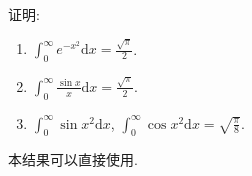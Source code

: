 \documentclass[../../main.tex]{subfiles}
\begin{document}
\begin{proposition}\label{proposition:重要定积分结果(必记)}
证明:
\begin{enumerate}[(1)]
\item \(\int_{0}^{\infty} e^{-x^{2}}\mathrm{d}x=\frac{\sqrt{\pi}}{2}\).

\item \(\int_{0}^{\infty} \frac{\sin x}{x}\mathrm{d}x=\frac{\sqrt{\pi}}{2}\).

\item\(\int_{0}^{\infty} \sin x^{2}\mathrm{d}x\), \(\int_{0}^{\infty} \cos x^{2}\mathrm{d}x=\sqrt{\frac{\pi}{8}}\). 
\end{enumerate}
\end{proposition}
\begin{note}
本结果可以直接使用.
\end{note}
\end{document}
